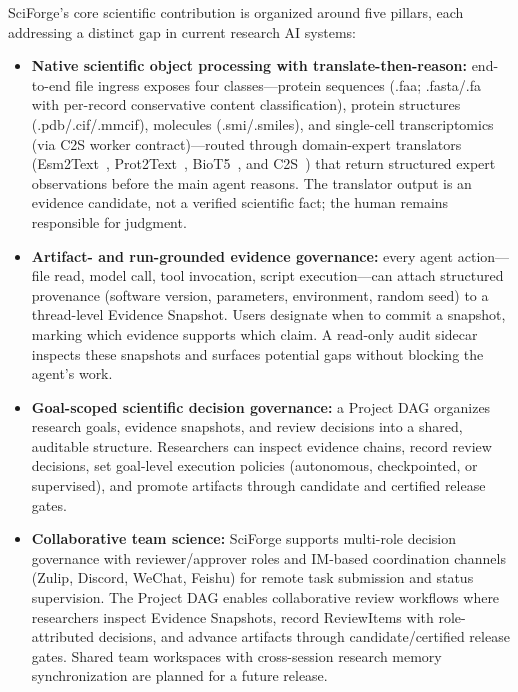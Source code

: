 \documentclass[sn-basic,Numbered,pdflatex]{sn-jnl}
\begin{document}
SciForge's core scientific contribution is organized around five pillars, each addressing a distinct gap in current research AI systems:
\begin{itemize}
    \item \textbf{Native scientific object processing with translate-then-reason:} end-to-end file ingress exposes four classes---protein sequences (.faa; .fasta/.fa with per-record conservative content classification), protein structures (.pdb/.cif/.mmcif), molecules (.smi/.smiles), and single-cell transcriptomics (via C2S worker contract)---routed through domain-expert translators (Esm2Text~\cite{abdine2023prot2text}, Prot2Text~\cite{abdine2023prot2text}, BioT5~\cite{pei2024biot5}, and C2S~\cite{rizvi2025c2s}) that return structured expert observations before the main agent reasons. The translator output is an evidence candidate, not a verified scientific fact; the human remains responsible for judgment.

    \item \textbf{Artifact- and run-grounded evidence governance:} every agent action---file read, model call, tool invocation, script execution---can attach structured provenance (software version, parameters, environment, random seed) to a thread-level Evidence Snapshot. Users designate when to commit a snapshot, marking which evidence supports which claim. A read-only audit sidecar inspects these snapshots and surfaces potential gaps without blocking the agent's work.

    \item \textbf{Goal-scoped scientific decision governance:} a Project DAG organizes research goals, evidence snapshots, and review decisions into a shared, auditable structure. Researchers can inspect evidence chains, record review decisions, set goal-level execution policies (autonomous, checkpointed, or supervised), and promote artifacts through candidate and certified release gates.

    \item \textbf{Collaborative team science:} SciForge supports multi-role decision governance with reviewer/approver roles and IM-based coordination channels (Zulip, Discord, WeChat, Feishu) for remote task submission and status supervision. The Project DAG enables collaborative review workflows where researchers inspect Evidence Snapshots, record ReviewItems with role-attributed decisions, and advance artifacts through candidate/certified release gates. Shared team workspaces with cross-session research memory synchronization are planned for a future release.


\end{itemize}
\end{document}
